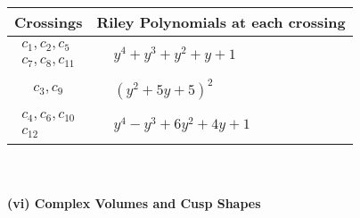 \documentclass[1p]{elsarticle_modified}
\theoremstyle{definition}
\begin{document}
\begin{tabular}{m{50pt}|m{274pt}}
Crossings & \hspace{64pt}Riley Polynomials at each crossing \\
\hline $$\begin{aligned}c_{1},c_{2},c_{5}\\c_{7},c_{8},c_{11}\end{aligned}$$&$\begin{aligned}
&y^4+y^3+y^2+y+1
\end{aligned}$\\
\hline $$\begin{aligned}c_{3},c_{9}\end{aligned}$$&$\begin{aligned}
&(y^2+5 y+5)^2
\end{aligned}$\\
\hline $$\begin{aligned}c_{4},c_{6},c_{10}\\c_{12}\end{aligned}$$&$\begin{aligned}
&y^4- y^3+6 y^2+4 y+1
\end{aligned}$\\
\hline
\end{tabular}\\~\\
\newpage\flushleft \textbf{(vi) Complex Volumes and Cusp Shapes}
\end{document}
